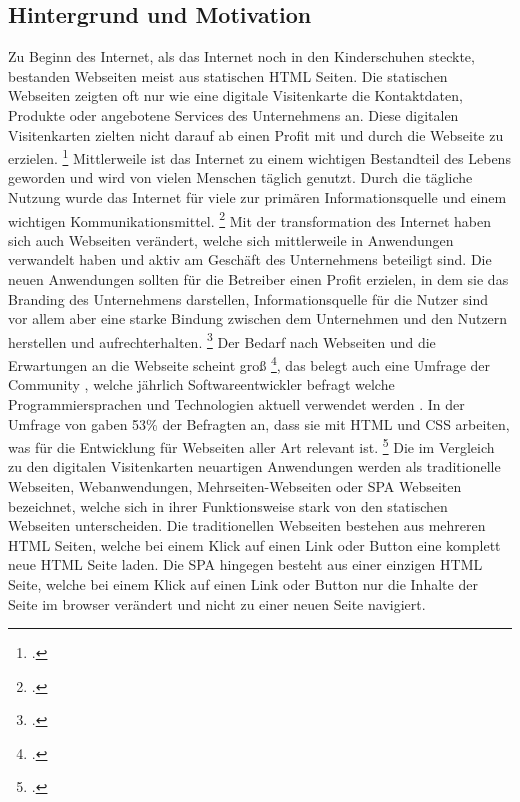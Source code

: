 \subsection{Hintergrund und Motivation}
Zu Beginn des Internet, als das Internet noch in den Kinderschuhen steckte, bestanden Webseiten meist aus statischen \ac{HTML} Seiten.
Die statischen Webseiten zeigten oft nur wie eine digitale Visitenkarte die Kontaktdaten, Produkte oder angebotene Services des Unternehmens an.
Diese digitalen Visitenkarten zielten nicht darauf ab einen Profit mit und durch die Webseite zu erzielen. \footcite[Vgl.][Seite 1]{Bly2018}
Mittlerweile ist das Internet zu einem wichtigen Bestandteil des Lebens geworden und wird von vielen Menschen täglich genutzt.
Durch die tägliche Nutzung wurde das Internet für viele zur primären Informationsquelle und einem wichtigen Kommunikationsmittel. \footcite[Vgl.][Seite 1]{conf/pi/Sassenberg}
Mit der transformation des Internet haben sich auch Webseiten verändert, welche sich mittlerweile in Anwendungen verwandelt haben und aktiv am Geschäft des Unternehmens beteiligt sind.
Die neuen Anwendungen sollten für die Betreiber einen Profit erzielen, in dem sie das Branding des Unternehmens darstellen, Informationsquelle für die Nutzer sind vor allem aber eine starke Bindung zwischen dem Unternehmen und den Nutzern herstellen und aufrechterhalten. \footcite[Vgl.][Seite 1]{Bly2018}
Der Bedarf nach Webseiten und die Erwartungen an die Webseite scheint groß \footcite[Vgl.][Seite 1]{Smith2022}, das belegt auch eine Umfrage der Community , welche jährlich Softwareentwickler befragt welche Programmiersprachen und Technologien aktuell verwendet werden .
In der Umfrage von  gaben  53\% der Befragten an, dass sie mit \ac{HTML} und \ac{CSS} arbeiten, was für die Entwicklung für Webseiten aller Art relevant ist. \footcite[Vgl.][most-popular-technologies-programming-scripting-and-markup-languages]{StackOverflow2023}
Die im Vergleich zu den digitalen Visitenkarten neuartigen Anwendungen werden als traditionelle Webseiten, Webanwendungen, Mehrseiten-Webseiten oder \ac{SPA} Webseiten bezeichnet, welche sich in ihrer Funktionsweise stark von den statischen Webseiten unterscheiden.
Die traditionellen Webseiten bestehen aus mehreren \ac{HTML} Seiten, welche bei einem Klick auf einen Link oder Button eine komplett neue \ac{HTML} Seite laden.
Die \ac{SPA} hingegen besteht aus einer einzigen \ac{HTML} Seite, welche bei einem Klick auf einen Link oder Button nur die Inhalte der Seite im \gls{browser} verändert und nicht zu einer neuen Seite navigiert.
